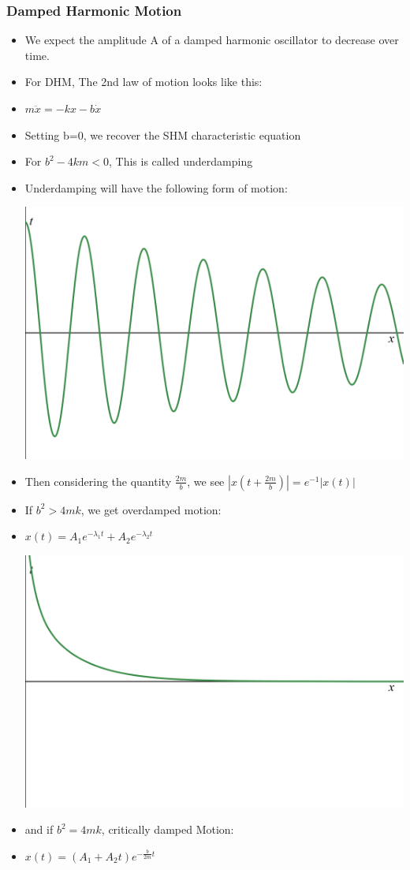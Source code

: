 \documentclass{article}
\begin{document}
\subsubsection*{Damped Harmonic Motion}

\begin{itemize}
    \item We expect the amplitude A of a damped harmonic oscillator to decrease over time.
    \item For DHM, The 2nd law of motion looks like this:
    \item \(m\ddot x = -kx - b\dot x\)
    \item Setting b=0, we recover the SHM characteristic equation
    \item For \(b^2-4km<0\), This is called underdamping
    \item Underdamping will have the following form of motion:
    
    \includegraphics[width = .5\linewidth]{year1/wfmp/periodic-motion/DHM.png}
    \item Then considering the quantity \(\frac{2m}{b}\), we see \(|x(t+\frac{2m}{b})|=e^{-1}|x(t)|\)

    \item If \(b^2>4mk\), we get overdamped motion:
    \item \(x(t)=A_1 e^{-\lambda_1 t} + A_2 e^{-\lambda_2 t}\)

    \includegraphics[width=.5\linewidth]{year1/wfmp/periodic-motion/overdamped.png}
    \item and if \(b^2=4mk\), critically damped Motion:
    \item \(x(t)=(A_1 + A_2 t)e^{-\frac{b}{2m}t}\)
    

\end{itemize}
\end{document}
